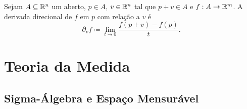 \begin{defi}
	Sejam $A \subseteq \mathbb{R}^n$ um aberto, $p \in A$, $v \in \mathbb{R}^n$ tal que $p+v \in A$ e $f: A \to \mathbb{R}^m$. A derivada direcional de $f$ em $p$ com relação a $v$ é
	\begin{equation*}
	\partial_v f \coloneqq \lim_{t \to 0} \frac{f(p+v)-f(p)}{t}.
	\end{equation*}
\end{defi}
































































\chapter{Teoria da Medida}

\section{Sigma-Álgebra e Espaço Mensurável}

